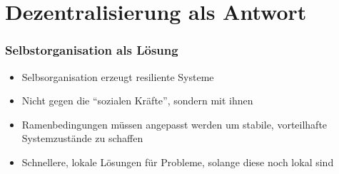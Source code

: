 \section{Dezentralisierung als Antwort}
\begin{frame}
	\frametitle{Selbstorganisation als Lösung}
	\begin{itemize}
		\item
			Selbsorganisation erzeugt resiliente Systeme
		\item
			Nicht gegen die \enquote{sozialen Kräfte}, sondern mit ihnen
		\item
			Ramenbedingungen müssen angepasst werden um stabile, vorteilhafte Systemzustände zu schaffen
		\item
			Schnellere, lokale Lösungen für Probleme, solange diese noch lokal sind
	\end{itemize}
\end{frame}




